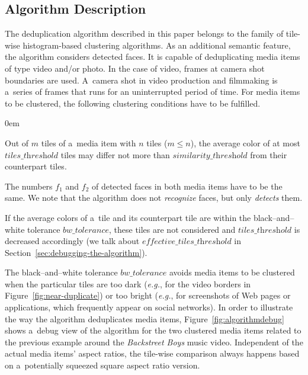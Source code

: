 \documentclass{article}
\begin{document}
\subsection{Algorithm Description}
The deduplication algorithm described in this paper belongs to the family of tile-wise histogram-based clustering algorithms. As an additional semantic feature, the algorithm considers detected faces. It is capable of deduplicating media items of type video and/or photo. In the case of video, frames at camera shot boundaries are used. A~camera shot in video production and filmmaking is a~series of frames that runs for an uninterrupted period of time. For media items to be clustered, the following clustering conditions have to be fulfilled.
\begin{description}
  \itemsep0em
  \item[Cond.~1] Out of $m$ tiles of a~media item with $n$ tiles ($m \leq n$), the average color of at most $\textit{tiles\_threshold}$ tiles may differ not more than $\textit{similarity\_threshold}$ from their counterpart tiles.
  \item[Cond.~2] The numbers $f_1$ and $f_2$ of detected faces in both media items have to be the same. We note that the algorithm does not \emph{recognize} faces, but only \emph{detects} them.
  \item[Cond.~3] If the average colors of a~tile and its counterpart tile are within the black--and--white tolerance $\textit{bw\_tolerance}$, these tiles are not considered and $\textit{tiles\_threshold}$ is decreased accordingly (we talk about $\textit{effective\_tiles\_threshold}$ in Section~\ref{sec:debugging-the-algorithm}).
\end{description}

The black--and--white tolerance $\textit{bw\_tolerance}$ avoids media items to be clustered when the particular tiles are too dark (\emph{e.g.}, for the video borders in Figure~\ref{fig:near-duplicate}) or too bright (\emph{e.g.}, for screenshots of Web pages or applications, which frequently appear on social networks). In order to illustrate the way the algorithm deduplicates media items, Figure~\ref{fig:algorithmdebug} shows a~debug view of the algorithm for the two clustered media items related to the previous example around the \emph{Backstreet Boys} music video. Independent of the actual media items' aspect ratios, the tile-wise comparison always happens based on a~potentially squeezed square aspect ratio version.
\end{document}
